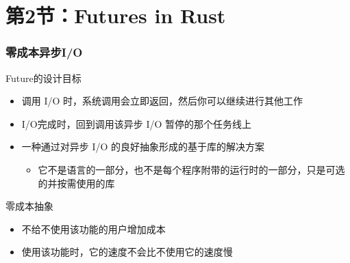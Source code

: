 \section{第2节：Futures in Rust} %
% 
% 
\begin{frame}[fragile]
    \frametitle{零成本异步I/O}
% 
% 
% 
Future的设计目标

    \begin{itemize}
        \item 调用 I/O 时，系统调用会立即返回，然后你可以继续进行其他工作
        \item I/O完成时，回到调用该异步 I/O 暂停的那个任务线上
        \item {\color{red}一种通过对异步 I/O 的良好抽象形成的基于库的解决方案}
    	\begin{itemize}
    	    \item 它不是语言的一部分，也不是每个程序附带的运行时的一部分，只是可选的并按需使用的库
    	\end{itemize}
    \end{itemize}

{\color{red}零成本抽象}
% 
    \begin{itemize}
        \item 不给不使用该功能的用户增加成本
        \item 使用该功能时，它的速度不会比不使用它的速度慢
    \end{itemize}
% 
\end{frame}
